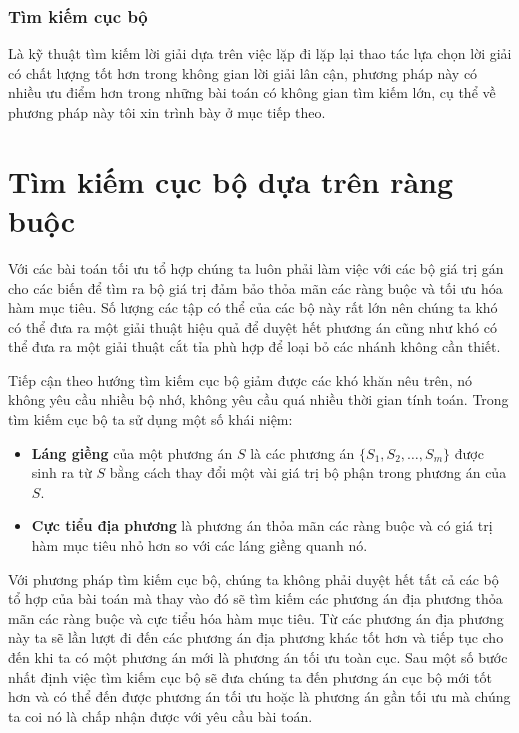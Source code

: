 \subsubsection*{Tìm kiếm cục bộ \cite{dungpq2015cbls}}
Là kỹ thuật tìm kiếm lời giải dựa trên việc lặp đi lặp lại thao tác lựa chọn lời giải có chất lượng tốt hơn trong không gian lời giải lân cận, phương pháp này có nhiều ưu điểm hơn trong những bài toán có không gian tìm kiếm lớn, cụ thể về phương pháp này tôi xin trình bày ở mục tiếp theo.
\section{Tìm kiếm cục bộ dựa trên ràng buộc}
Với các bài toán tối ưu tổ hợp chúng ta luôn phải làm việc với các bộ giá trị gán cho các biến để tìm ra bộ giá trị đảm bảo thỏa mãn các ràng buộc và tối ưu hóa hàm mục tiêu. Số lượng các tập có thể của các bộ này rất lớn nên chúng ta khó có thể đưa ra một giải thuật hiệu quả để duyệt hết phương án cũng như khó có thể đưa ra một giải thuật cắt tỉa phù hợp để loại bỏ các nhánh không cần thiết.

Tiếp cận theo hướng tìm kiếm cục bộ giảm được các khó khăn nêu trên, nó không yêu cầu nhiều bộ nhớ, không yêu cầu quá nhiều thời gian tính toán. Trong tìm kiếm cục bộ ta sử dụng một số khái niệm:
\begin{itemize}
	\item \textbf{Láng giềng} của một phương án $S$ là các phương án $\{S_1, S_2,\dots, S_m\}$ được sinh ra từ $S$ bằng cách thay đổi một vài giá trị bộ phận trong phương án của $S$.
	\item \textbf{Cực tiểu địa phương} là phương án thỏa mãn các ràng buộc và có giá trị hàm mục tiêu nhỏ hơn so với các láng giềng quanh nó.
\end{itemize}

Với phương pháp tìm kiếm cục bộ, chúng ta không phải duyệt hết tất cả các bộ tổ hợp của bài toán mà thay vào đó sẽ tìm kiếm các phương án địa phương thỏa mãn các ràng buộc và cực tiểu hóa hàm mục tiêu. Từ các phương án địa phương này ta sẽ lần lượt đi đến các phương án địa phương khác tốt hơn và tiếp tục cho đến khi ta có một phương án mới là phương án tối ưu toàn cục. Sau một số bước nhất định việc tìm kiếm cục bộ sẽ đưa chúng ta đến phương án cục bộ mới tốt hơn và có thể đến được phương án tối ưu hoặc là phương án gần tối ưu mà chúng ta coi nó là chấp nhận được với yêu cầu bài toán.

